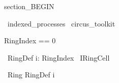 section_BEGIN
\begin{zsection}
  \SECTION\ indexed\_processes \parents\ circus\_toolkit
\end{zsection}

\begin{zed}
     RingIndex == 0 
\end{zed}

\begin{circus}
	\circprocess\ RingDef \circdef \Interleave i: RingIndex \circindex\ IRingCell   
\end{circus}

\begin{circus}
	\circprocess\ Ring \circdef RingDef \circlinst i \circrinst 
\end{circus}

